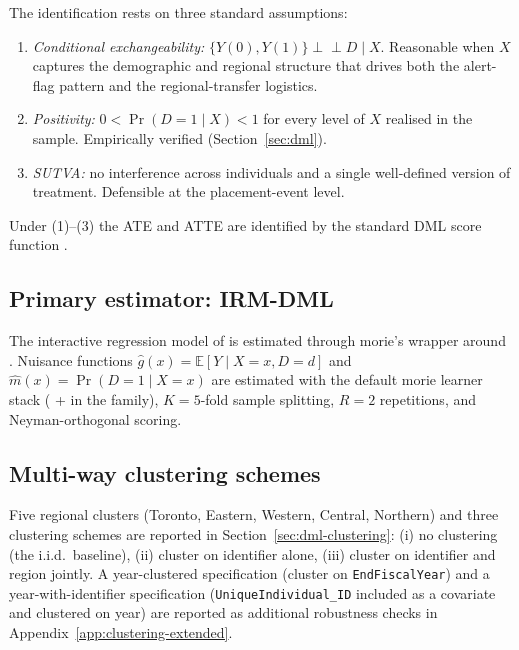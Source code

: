\documentclass[article,shortnames,nojss]{jss}
\renewcommand{\E}{\mathbb{E}}
\newcommand{\indep}{\perp\!\!\!\perp}
\begin{document}
The identification rests on three standard assumptions:
\begin{enumerate}
\item \emph{Conditional exchangeability:}
      $\{Y(0), Y(1)\} \indep D \mid X$. Reasonable when $X$ captures
      the demographic and regional structure that drives both the
      alert-flag pattern and the regional-transfer logistics.
\item \emph{Positivity:} $0 < \Pr(D=1 \mid X) < 1$ for every level
      of $X$ realised in the sample. Empirically verified
      (Section~\ref{sec:dml}).
\item \emph{SUTVA:} no interference across individuals and a single
      well-defined version of treatment. Defensible at the
      placement-event level.
\end{enumerate}
Under (1)--(3) the ATE and ATTE are identified by the standard
DML score function \citep{Chernozhukov2018DML}.

\subsection{Primary estimator: IRM-DML}
\label{sec:methods-irm}

The interactive regression model of \citet{Chernozhukov2018DML} is
estimated through morie's wrapper around 
\citep{Bach2024DoubleML, Bach2022DoubleMLpy}. Nuisance functions
$\hat{g}(x) = \E[Y \mid X=x, D=d]$ and $\hat{m}(x) = \Pr(D=1 \mid X=x)$
are estimated with the default morie learner stack
( +  in the  family),
$K=5$-fold sample splitting, $R=2$ repetitions, and Neyman-orthogonal
scoring.

\subsection{Multi-way clustering schemes}
\label{sec:methods-clustering}

Five regional clusters (Toronto, Eastern, Western, Central, Northern)
and three clustering schemes are reported in
Section~\ref{sec:dml-clustering}: (i) no clustering (the i.i.d.\
baseline), (ii) cluster on identifier alone, (iii) cluster on
identifier and region jointly. A year-clustered specification
(cluster on \texttt{EndFiscalYear}) and a year-with-identifier
specification (\texttt{UniqueIndividual\_ID} included as a covariate
and clustered on year) are reported as additional robustness checks
in Appendix~\ref{app:clustering-extended}.
\end{document}
